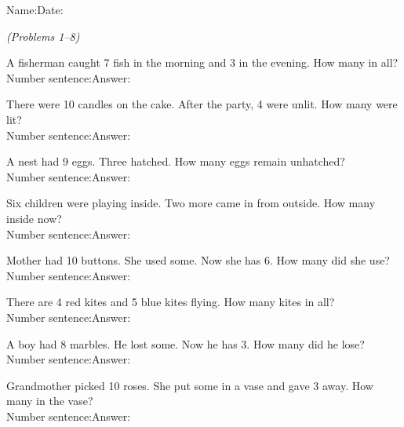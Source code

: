 \documentclass[12pt, letterpaper]{article}
\begin{document}

{\small Name:\ansblanklg \hfill Date:\ansblank}
\goldrule

 \hfill \textit{(Problems 1–8)}

\bigskip
\prob A fisherman caught 7 fish in the morning and 3 in the evening. How many in all?\\[6pt]
\hspace{2em}Number sentence:\ansblanklg \quad Answer:\ansblank

\medskip
\prob There were 10 candles on the cake. After the party, 4 were unlit. How many were lit?\\[6pt]
\hspace{2em}Number sentence:\ansblanklg \quad Answer:\ansblank

\medskip
\prob A nest had 9 eggs. Three hatched. How many eggs remain unhatched?\\[6pt]
\hspace{2em}Number sentence:\ansblanklg \quad Answer:\ansblank

\medskip
\prob Six children were playing inside. Two more came in from outside. How many inside now?\\[6pt]
\hspace{2em}Number sentence:\ansblanklg \quad Answer:\ansblank

\medskip
\prob Mother had 10 buttons. She used some. Now she has 6. How many did she use?\\[6pt]
\hspace{2em}Number sentence:\ansblanklg \quad Answer:\ansblank

\medskip
\prob There are 4 red kites and 5 blue kites flying. How many kites in all?\\[6pt]
\hspace{2em}Number sentence:\ansblanklg \quad Answer:\ansblank

\medskip
\prob A boy had 8 marbles. He lost some. Now he has 3. How many did he lose?\\[6pt]
\hspace{2em}Number sentence:\ansblanklg \quad Answer:\ansblank

\medskip
\prob Grandmother picked 10 roses. She put some in a vase and gave 3 away. How many in the vase?\\[6pt]
\hspace{2em}Number sentence:\ansblanklg \quad Answer:\ansblank
\end{document}
